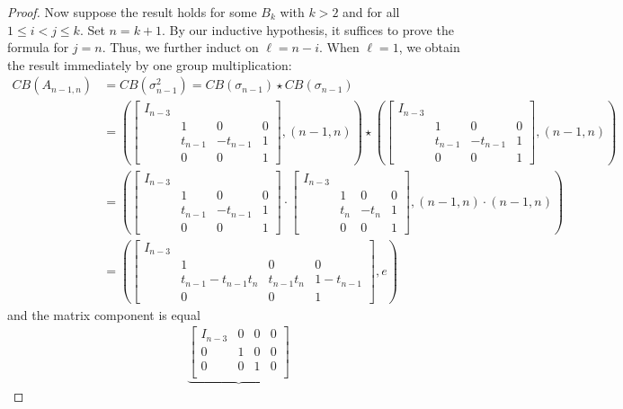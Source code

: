 \documentclass[10pt,a4paper]{amsart}
\begin{document}
\begin{proof}
	Now suppose the result holds for some $B_k$ with $k>2$ and for all 
	$1\leq i<j \leq k$. Set $n=k+1$. By our inductive hypothesis, it suffices to prove 
	the formula for $j=n$. Thus, we further induct on $\ell=n-i$. When $\ell=1$, we 
	obtain the result immediately by one group multiplication:
	\begin{align*}
		CB(A_{n-1,n})&=CB(\sigma_{n-1}^2)=CB(\sigma_{n-1})\star CB(\sigma_{n-1})\\
		&=
		\left(
		\begin{bmatrix}
			I_{n-3}&\\
			& 1 & 0 & 0\\
			& t_{n-1} & -t_{n-1} & 1\\
			& 0& 0& 1
		\end{bmatrix},(n-1,n)
		\right)
		\star
		\left(
		\begin{bmatrix}
			I_{n-3}&\\
			& 1 & 0 &0\\
			& t_{n-1} & -t_{n-1}&1\\
			& 0& 0& 1
		\end{bmatrix},(n-1,n)
		\right)\\
		&=
		\left(
		\begin{bmatrix}
			I_{n-3}&\\
			& 1 & 0&0\\
			& t_{n-1} & -t_{n-1}&1\\
			& 0& 0& 1
		\end{bmatrix}
		\cdot
		\begin{bmatrix}
			I_{n-3}&\\
			& 1 & 0&0\\
			& t_n & -t_n&1\\
			& 0& 0& 1
		\end{bmatrix},(n-1,n)\cdot(n-1,n)
		\right)\\
		&=
		\left(
		\begin{bmatrix}
			I_{n-3}&\\
			& 1 & 0&0\\
			& t_{n-1}-t_{n-1}t_n & t_{n-1}t_n&1-t_{n-1}\\
			& 0& 0& 1
		\end{bmatrix}, e
		\right)
	\end{align*}
	and the matrix component is equal
	\begin{align*}
		&\underbrace{\begin{bmatrix}
				I_{n-3} & 0 & 0 & 0\\
				0 & 1 & 0 & 0 \\
				0 & 0 & 1 & 0 \\

\end{bmatrix}}
\end{align*}
\end{proof}
\end{document}
